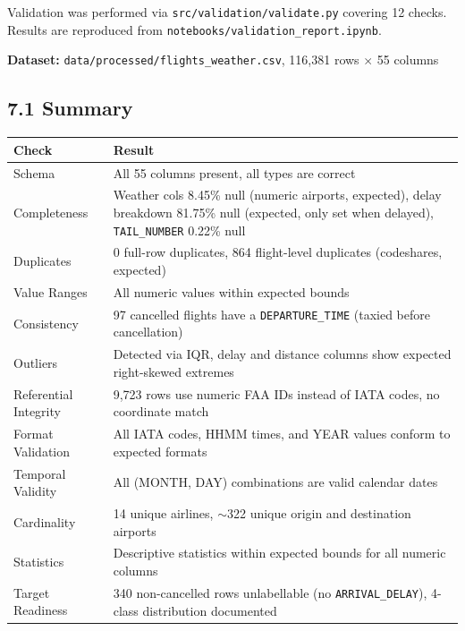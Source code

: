 \documentclass{article}
\newcommand{\code}[1]{\texttt{\small #1}}
\begin{document}
Validation was performed via \code{src/validation/validate.py} covering 12 checks. Results are reproduced from \code{notebooks/validation\_report.ipynb}.

\begin{tcolorbox}[quotebox]
\textbf{Dataset:} \code{data/processed/flights\_weather.csv}, 116,381 rows $\times$ 55 columns
\end{tcolorbox}

\subsection*{\textcolor{accentgold}{7.1 Summary}}

\begin{tcolorbox}[mainbox, title={Validation Checks Summary}]
\renewcommand{\arraystretch}{1.4}
\begin{tabularx}{\textwidth}{L{4cm} X}
    \toprule
    \textbf{Check} & \textbf{Result} \\
    \midrule
    Schema             & All 55 columns present, all types are correct \\
    Completeness       & Weather cols 8.45\% null (numeric airports, expected), delay breakdown 81.75\% null (expected, only set when delayed), \code{TAIL\_NUMBER} 0.22\% null \\
    Duplicates         & 0 full-row duplicates, 864 flight-level duplicates (codeshares, expected) \\
    Value Ranges       & All numeric values within expected bounds \\
    Consistency        & 97 cancelled flights have a \code{DEPARTURE\_TIME} (taxied before cancellation) \\
    Outliers           & Detected via IQR, delay and distance columns show expected right-skewed extremes \\
    Referential Integrity & 9,723 rows use numeric FAA IDs instead of IATA codes, no coordinate match \\
    Format Validation  & All IATA codes, HHMM times, and YEAR values conform to expected formats \\
    Temporal Validity  & All (MONTH, DAY) combinations are valid calendar dates \\
    Cardinality        & 14 unique airlines, $\sim$322 unique origin and destination airports \\
    Statistics         & Descriptive statistics within expected bounds for all numeric columns \\
    Target Readiness   & 340 non-cancelled rows unlabellable (no \code{ARRIVAL\_DELAY}), 4-class distribution documented \\
    \bottomrule
\end{tabularx}
\end{tcolorbox}
\end{document}
